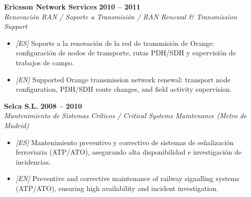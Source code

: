 \vspace{6pt}

\noindent \textbf{Ericsson Network Services} \hfill \textbf{2010 -- 2011}\\
\textit{Renovación RAN / Soporte a Transmisión / RAN Renewal & Transmission Support}
\begin{itemize}
    \item \textit{[ES]} Soporte a la renovación de la red de transmisión de Orange: configuración de nodos de transporte, rutas PDH/SDH y supervisión de trabajos de campo.
    \item \textit{[EN]} Supported Orange transmission network renewal: transport node configuration, PDH/SDH route changes, and field activity supervision.
\end{itemize}

\vspace{6pt}

\noindent \textbf{Selca S.L.} \hfill \textbf{2008 -- 2010}\\
\textit{Mantenimiento de Sistemas Críticos / Critical Systems Maintenance (Metro de Madrid)}
\begin{itemize}
    \item \textit{[ES]} Mantenimiento preventivo y correctivo de sistemas de señalización ferroviaria (ATP/ATO), asegurando alta disponibilidad e investigación de incidencias.
    \item \textit{[EN]} Preventive and corrective maintenance of railway signalling systems (ATP/ATO), ensuring high availability and incident investigation.
\end{itemize}
